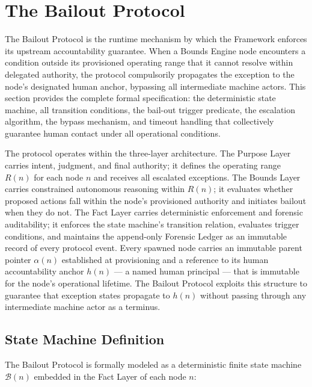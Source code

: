 \section{The Bailout Protocol}
\label{sec:bailout-protocol}

The Bailout Protocol is the runtime mechanism by which the \bxthree{} Framework enforces its upstream accountability guarantee. When a Bounds Engine node encounters a condition outside its provisioned operating range that it cannot resolve within delegated authority, the protocol compulsorily propagates the exception to the node's designated human anchor, bypassing all intermediate machine actors. This section provides the complete formal specification: the deterministic state machine, all transition conditions, the bail-out trigger predicate, the escalation algorithm, the bypass mechanism, and timeout handling that collectively guarantee human contact under all operational conditions.

The protocol operates within the \bxthree{} three-layer architecture. The Purpose Layer carries intent, judgment, and final authority; it defines the operating range $R(n)$ for each node $n$ and receives all escalated exceptions. The Bounds Layer carries constrained autonomous reasoning within $R(n)$; it evaluates whether proposed actions fall within the node's provisioned authority and initiates bailout when they do not. The Fact Layer carries deterministic enforcement and forensic auditability; it enforces the state machine's transition relation, evaluates trigger conditions, and maintains the append-only Forensic Ledger as an immutable record of every protocol event. Every spawned node carries an immutable parent pointer $\alpha(n)$ established at provisioning and a reference to its human accountability anchor $h(n)$ --- a named human principal --- that is immutable for the node's operational lifetime. The Bailout Protocol exploits this structure to guarantee that exception states propagate to $h(n)$ without passing through any intermediate machine actor as a terminus.

\subsection{State Machine Definition}
\label{sec:bailout-state-machine}

The Bailout Protocol is formally modeled as a deterministic finite state machine $\mathcal{B}(n)$ embedded in the Fact Layer of each \bxthree{} node $n$:

